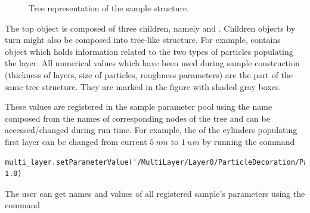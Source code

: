 \begin{figure}[p!]
\caption{Tree representation of the sample structure.}
\label{fig:sample_tree}
\end{figure}


The top  object is composed of three children, namely
 and . Children objects
by turn might also be composed into tree-like structure. For example,
 contains  object which holds  information
related to the two types of particles populating the layer. All numerical values which have been used
during sample construction (thickness of layers, size of particles, roughness parameters) are the part of the same tree structure. 
They are marked in the figure with shaded gray boxes.

These values are registered in the sample parameter pool using the name
composed from the names of corresponding nodes of the tree and can be accessed/changed
during run time. For example, the  of the cylinders populating first layer can be changed from 
current $5~nm$ to $1~nm$ by running the command

\begin{lstlisting}[language=shell, style=commandline]
multi_layer.setParameterValue('/MultiLayer/Layer0/ParticleDecoration/ParticleInfo0/Particle/FormFactorCylinder/height', 1.0)
\end{lstlisting}


The user can get names and values of all registered sample's parameters using the command 

